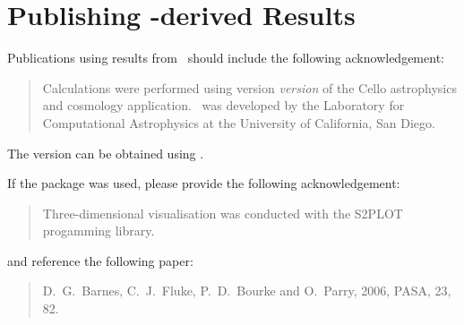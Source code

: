 \documentclass{article}
\begin{document}
\section{Publishing \cello-derived Results}

Publications using results from \cello\ should include the following
acknowledgement:

\begin{quotation}
Calculations were performed using version \textit{version} of the
Cello astrophysics and cosmology application.  \cello\ was developed
by the Laboratory for Computational Astrophysics at the University of
California, San Diego.
\end{quotation}


The version can be obtained using .  


If the  package was used, please provide the following
acknowledgement:

\begin{quotation}
  Three-dimensional visualisation was conducted with the S2PLOT
   progamming library.
\end{quotation}

and reference the following paper:

\begin{quotation}
  D.~G.~Barnes, C.~J.~Fluke, P.~D.~Bourke and O.~Parry, 2006, PASA, 23, 82.
\end{quotation}
\end{document}
